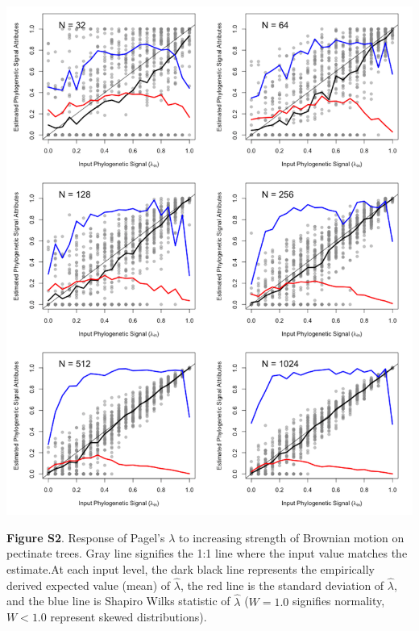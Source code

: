 \documentclass[
]{article}
\begin{document}
\includegraphics[width=0.95\linewidth]{fig.S2}

\textbf{Figure S2}. Response of Pagel's \(\lambda\) to increasing
strength of Brownian motion on pectinate trees. Gray line signifies the
1:1 line where the input value matches the estimate.At each input level,
the dark black line represents the empirically derived expected value
(mean) of \(\hat\lambda\), the red line is the standard deviation of
\(\hat\lambda\), and the blue line is Shapiro Wilks statistic of
\(\hat\lambda\) (\(W=1.0\) signifies normality, \(W< 1.0\) represent
skewed distributions).
\end{document}
